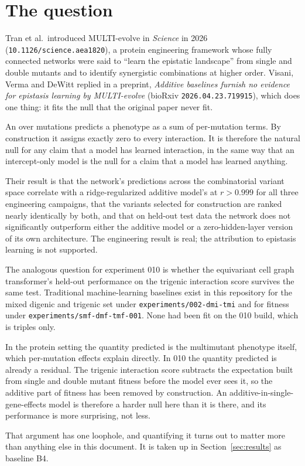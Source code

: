 
\section{The question}

Tran et al.\ introduced MULTI-evolve in \emph{Science} in 2026
(\texttt{10.1126/science.aea1820}), a protein engineering framework whose fully
connected networks were said to ``learn the epistatic landscape'' from single
and double mutants and to identify synergistic combinations at higher order.
Visani, Verma and DeWitt replied in a preprint,
\emph{Additive baselines furnish no evidence for epistasis learning by
MULTI-evolve} (bioRxiv \texttt{2026.04.23.719915}), which does one thing: it
fits the null that the original paper never fit.

An  over mutations predicts a phenotype as a sum of
per-mutation terms. By construction it assigns exactly zero to every
interaction. It is therefore the natural null for any claim that a model has
learned interaction, in the same way that an intercept-only model is the null
for a claim that a model has learned anything.

Their result is that the network's predictions across the combinatorial variant
space correlate with a ridge-regularized additive model's at $r > 0.999$ for all
three engineering campaigns, that the variants selected for construction are
ranked nearly identically by both, and that on held-out test data the network
does not significantly outperform either the additive model or a zero-hidden-layer
version of its own architecture. The engineering result is real; the attribution
to epistasis learning is not supported.

The analogous question for experiment 010 is whether the equivariant cell graph
transformer's held-out performance on the trigenic interaction score survives
the same test. Traditional machine-learning baselines exist in this repository
for the mixed digenic and trigenic set under \texttt{experiments/002-dmi-tmi}
and for fitness under \texttt{experiments/smf-dmf-tmf-001}. None had been fit on
the 010 build, which is triples only.

In the protein setting the quantity predicted is the multimutant phenotype
itself, which per-mutation effects explain directly. In 010 the quantity
predicted is already a residual. The trigenic interaction score subtracts the
expectation built from single and double mutant fitness before the model ever
sees it, so the additive part of fitness has been removed by construction. An
additive-in-single-gene-effects model is therefore a harder null here than it is
there, and its performance is more surprising, not less.

That argument has one loophole, and quantifying it turns out to matter more than
anything else in this document. It is taken up in
Section~\ref{sec:results} as baseline B4.
